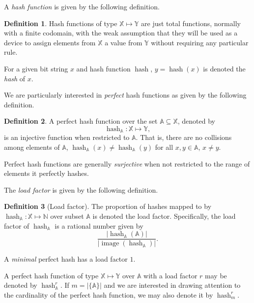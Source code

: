 \documentclass[
]{article}
\theoremstyle{definition}
\newtheorem{definition}{Definition}[section]
\theoremstyle{definition}
\theoremstyle{definition}
\theoremstyle{definition}
\theoremstyle{remark}
\begin{document}
A \emph{hash function} is given by the following definition.

\begin{definition}
Hash functions of type \(\mathbb{X} \mapsto \mathbb{Y}\) are just total
functions, normally with a finite codomain, with the weak assumption that they
will be used as a device to assign elements from \(\mathbb{X}\) a value from
\(\mathbb{Y}\) without requiring any particular rule.
\end{definition}

For a given bit string \(x\) and hash function \(\operatorname{hash}\),
\(y = \operatorname{hash}(x)\) is denoted the \emph{hash} of \(x\).

We are particularly interested in \emph{perfect} hash functions as given by the
following definition.

\begin{definition}
A perfect hash function over the set \(\mathbb{A} \subseteq \mathbb{X}\), denoted
by
\[
\operatorname{hash}_{\mathbb{A}} \colon \mathbb{X} \mapsto \mathbb{Y},
\]
is an injective function when restricted to \(\mathbb{A}\).
That is, there are no collisions among elements of \(\mathbb{A}\),
\(\operatorname{hash}_{\mathbb{A}}(x) \neq \operatorname{hash}_{\mathbb{A}}(y)\)
for all \(x, y \in \mathbb{A}\), \(x \neq y\).
\end{definition}

Perfect hash functions are generally \emph{surjective} when not restricted to
the range of elements it perfectly hashes.

The \emph{load factor} is given by the following definition.

\begin{definition}[Load factor]
\label{def:loadfactor}
The proportion of hashes mapped to by
\(\operatorname{hash}_{\mathbb{A}} \colon \mathbb{X} \mapsto \mathbb{N}\) over
subset \(\mathbb{A}\) is denoted the load factor.
Specifically, the load factor of \(\operatorname{hash}_{\mathbb{A}}\) is a rational number given
by
\[
\frac{|\operatorname{hash}_{\mathbb{A}}(\mathbb{A})|}
  {|{\operatorname{image}(\operatorname{hash}_{\mathbb{A}})}|}.
\]
\end{definition}

A \emph{minimal} perfect hash has a load factor \(1\).

A perfect hash function of type \(\mathbb{X} \mapsto \mathbb{Y}\) over
\(\mathbb{A}\) with a load factor \(r\) may be denoted by
\(\operatorname{hash}_{\mathbb{A}}^{r}\).
If \(m = |\{\mathbb{A}\}|\) and we are interested in drawing attention to the
cardinality of the perfect hash function, we may also denote it by
\(\operatorname{hash}_{m}^{r}\).
\end{document}
